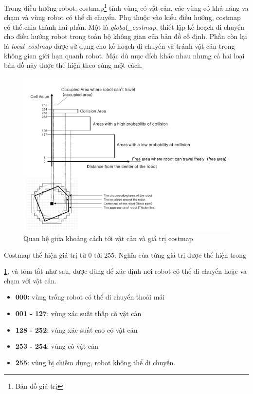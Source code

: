 {Trong điều hướng robot, costmap\footnote{Bản đồ giá trị} tính vùng có vật cản, các vùng có khả năng va chạm và vùng robot có thể di chuyển. Phụ thuộc vào kiểu điều hướng, costmap có thể chia thành hai phần. Một là \textit{global\_costmap}, thiết lập kế hoạch di chuyển cho điều hướng robot trong toàn bộ không gian của bản đồ cố định. Phần còn lại là \textit{local\ costmap} được sử dụng cho kế hoạch di chuyển và tránh vật cản trong không gian giới hạn quanh robot. Mặc dù mục đích khác nhau nhưng cả hai loại bản đồ này được thể hiện theo cùng một cách.

\begin{figure}[htbp]
  \centering
  \includegraphics[width=0.8\linewidth]{figures/relationship-distanceToObstacle-vs-costmapValue.png}
  \caption{Quan hệ giữa khoảng cách tới vật cản và giá trị costmap}
  \label{fig:relationship-distanceToObstacle-vs-costmapValue}
\end{figure}

Costmap thể hiện giá trị từ 0 tới 255. Nghĩa của từng giá trị được thể hiện trong \figurename{ \ref{fig:relationship-distanceToObstacle-vs-costmapValue}, và tóm tắt như sau, được dùng để xác định nơi robot có thể di chuyển hoặc va chạm với vật cản.

\begin{itemize}
  \item \textbf{000:} vùng trống robot có thể di chuyển thoải mái
  \item \textbf{001 - 127}: vùng xác suất thấp có vật cản
  \item \textbf{128 - 252}: vùng xác suất cao có vật cản
  \item \textbf{253 - 254}: vùng có vật cản
  \item \textbf{255}: vùng bị chiếm dụng, robot không thể di chuyển.
\end{itemize}

}}

